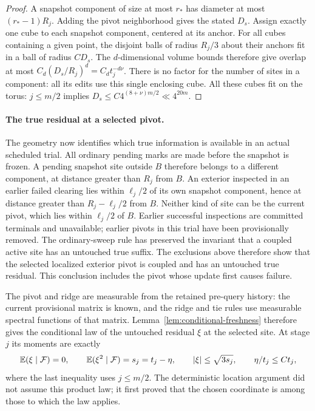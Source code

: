 \begin{proof}
A snapshot component of size at most $r_*$ has diameter at most
$(r_*-1)R_j$. Adding the pivot neighborhood gives the stated $D_s$.
Assign exactly one cube to each snapshot component, centered at its
anchor. For all cubes containing a given point, the disjoint balls of
radius $R_j/3$ about their anchors fit in a ball of radius $CD_s$.
The $d$-dimensional volume bounds therefore give overlap at most
$C_d(D_s/R_j)^d=C_dt_j^{-d\nu}$. There is no factor for the number of
sites in a component: all its edits use this single enclosing cube.
All these cubes fit on the torus: $j\le m/2$ implies
$D_s\le C4^{(8+\nu)m/2}\ll4^{20m}$.
\end{proof}

\paragraph{The true residual at a selected pivot.}
The geometry now identifies which true information is available in an
actual scheduled trial. All ordinary pending marks are made before the
snapshot is frozen. A pending snapshot site outside $B$ therefore belongs
to a different component, at distance greater than $R_j$ from $B$.
An exterior inspected in an earlier failed clearing lies within
$\ell_j/2$ of its own snapshot component, hence at distance greater than
$R_j-\ell_j/2$ from $B$. Neither kind of site can be the current pivot,
which lies within $\ell_j/2$ of $B$. Earlier successful inspections are
committed terminals and unavailable; earlier pivots in this trial have
been provisionally removed. The ordinary-sweep rule has preserved the
invariant that a coupled active site has an untouched true suffix. The
exclusions above therefore show that the selected localized exterior pivot is
coupled and has an untouched true residual. This conclusion includes the pivot
whose update first causes failure.

The pivot and ridge are measurable from the retained pre-query history:
the current provisional matrix is known, and the ridge and tie rules use
measurable spectral functions of that matrix. Lemma~\ref{lem:conditional-freshness}
therefore gives the conditional law of the untouched residual $\xi$ at
the selected site. At stage $j$ its moments are exactly
\[
 \mathbb E(\xi\mid\mathcal F)=0,\qquad
 \mathbb E(\xi^2\mid\mathcal F)=s_j=t_j-\eta,\qquad
 |\xi|\le\sqrt{3s_j},\qquad \eta/t_j\le Ct_j,
\]
where the last inequality uses $j\le m/2$. The deterministic location
argument did not assume this product law; it first proved that the chosen
coordinate is among those to which the law applies.

